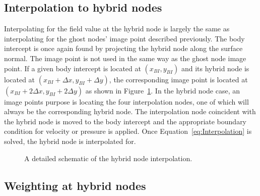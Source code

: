 \subsection{Interpolation to hybrid nodes}
\label{Sec:Interpolation}

Interpolating for the field value at the hybrid node is largely the same as interpolating for the ghost nodes' image point described previously. 
The body intercept is once again found by projecting the hybrid node along the surface normal. 
The image point is not used in the same way as the ghost node image point. 
If a given body intercept is located at $(x_{BI},y_{BI})$ and its hybrid node is located at $(x_{BI}+\Delta x,y_{BI}+\Delta y)$, the corresponding image point is located at $(x_{BI}+2\Delta x,y_{BI}+2\Delta y)$ as shown in Figure~\ref{fig:Interpolate}. 
In the hybrid node case, an image points purpose is locating the four interpolation nodes, one of which will always be the corresponding hybrid node. 
The interpolation node coincident with the hybrid node is moved to the body intercept and the appropriate boundary condition for velocity or pressure is applied.
Once Equation~\eqref{eq:Interpolation} is solved, the hybrid node is interpolated for.

\begin{figure}[!htb]
	\centering
	
	\caption{A detailed schematic of the hybrid node interpolation.}
	\label{fig:Interpolate}
\end{figure}

\subsection{Weighting at hybrid nodes}
\label{Sec:Weighting}

